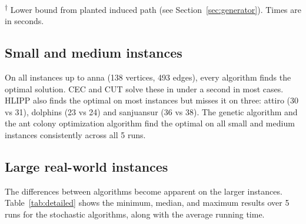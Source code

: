 \begin{table}[H]
\raggedright
\footnotesize
\textsuperscript{$\dagger$} Lower bound from planted induced path (see Section~\ref{sec:generator}). Times are in seconds.
\end{table}
\linespread{1.5}

\subsection{Small and medium instances}

On all instances up to anna (138 vertices, 493 edges), every algorithm finds the optimal solution. CEC and CUT solve these in under a second in most cases. HLIPP also finds the optimal on most instances but misses it on three: attiro (30 vs 31), dolphins (23 vs 24) and sanjuansur (36 vs 38). The genetic algorithm and the ant colony optimization algorithm find the optimal on all small and medium instances consistently across all 5 runs.

\subsection{Large real-world instances}

The differences between algorithms become apparent on the larger instances. Table~\ref{tab:detailed} shows the minimum, median, and maximum results over 5 runs for the stochastic algorithms, along with the average running time.

